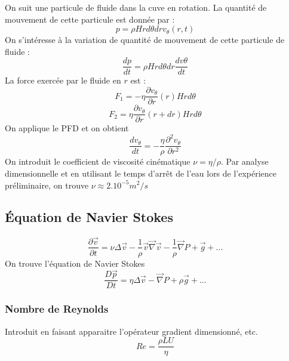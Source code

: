 On suit une particule de fluide dans la cuve en rotation.
La quantité de mouvement de cette particule est donnée par :
\begin{equation}
p = \rho Hrd\theta dr v_\theta(r,t)
\end{equation}
On s'intéresse à la variation de quantité de mouvement de cette particule de fluide :
\begin{equation}
\frac{dp}{dt} = \rho Hrd\theta dr \frac{dv\theta}{dt}
\end{equation}
La force exercée par le fluide en $r$ est :
\begin{equation}
F_1 = -\eta \frac{\partial v_\theta}{\partial r}(r) Hrd\theta
\end{equation}
\begin{equation}
F_2 = \eta \frac{\partial v_\theta}{\partial r}(r+dr) Hrd\theta
\end{equation}
On applique le PFD et on obtient
\begin{equation}
\frac{dv_\theta}{dt} = -\frac{\eta}{\rho} \frac{\partial^2v_\theta}{\partial r^2}
\end{equation}
On introduit le coefficient de viscosité cinématique $\nu=\eta/\rho$.
Par analyse dimensionnelle et en utilisant le temps d'arrêt de l'eau lors de l'expérience préliminaire, on trouve $\nu \approx 2.10^{-5} m^2/s$

\subsection{Équation de Navier Stokes}

\begin{equation}
\frac{\partial \overrightarrow{v}}{\partial t} = \nu \Delta \overrightarrow{v} - \frac{1}{\rho} \overrightarrow{v}\overrightarrow{\nabla}\overrightarrow{v}-\frac{1}{\rho} \overrightarrow{\nabla}P+\overrightarrow{g}+...
\end{equation}
On trouve l'équation de Navier Stokes
\begin{equation}
\frac{D\overrightarrow{p}}{Dt} = \eta\Delta \overrightarrow{v} - \overrightarrow{\nabla} P + \rho \overrightarrow{g}+...
\end{equation}

\subsubsection{Nombre de Reynolds}

Introduit en faisant apparaitre l'opérateur gradient dimensionné, etc.
\begin{equation}
Re = \frac{\rho L U}{\eta}
\end{equation}

